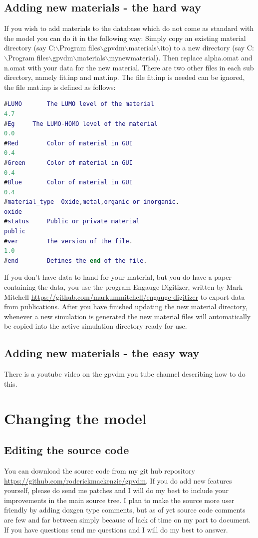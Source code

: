 \documentclass[11pt]{article}
\begin{document}
\subsection{Adding new materials - the hard way}
If you wish to add materials to the database which do not come as standard with the model you can do it in the following way:  Simply copy an existing material directory (say C:$\backslash$Program files$\backslash$gpvdm$\backslash$materials$\backslash$ito) to a new directory (say C:$\backslash$Program files$\backslash$gpvdm$\backslash$materials$\backslash$mynewmaterial).  Then replace alpha.omat and n.omat with your data for the new material. There are two other files in each sub directory, namely fit.inp and mat.inp.  The file fit.inp is needed can be ignored, the file mat.inp is defined as follows:
\newline
\newline
\begin{lstlisting}[language=matlab,frame=single]
#LUMO		The LUMO level of the material 
4.7
#Eg		The LUMO-HOMO level of the material
0.0
#Red		Color of material in GUI
0.4
#Green		Color of material in GUI
0.4
#Blue		Color of material in GUI
0.4
#material_type	Oxide,metal,organic or inorganic.
oxide
#status		Public or private material
public
#ver		The version of the file.
1.0
#end		Defines the end of the file.
\end{lstlisting}

If you don't have data to hand for your material, but you do have a paper containing the data, you use the program Engauge Digitizer, written by  Mark Mitchell \url{https://github.com/markummitchell/engauge-digitizer} to export data from publications.  After you have finished updating the new material directory, whenever a new simulation is generated the new material files will automatically be copied into the active simulation directory ready for use. 

\subsection{Adding new materials - the easy way}
There is a youtube video on the gpvdm you tube channel describing how to do this.

\section{Changing the model}
\subsection{Editing the source code}
You can download the source code from my git hub repository \url{https://github.com/roderickmackenzie/gpvdm}.  If you do add new features yourself, please do send me patches and I will do my best to include your improvements in the main source tree.  I plan to make the source more user friendly by adding doxgen type comments, but as of yet source code comments are few and far between simply because of lack of time on my part to document.  If you have questions send me questions and I will do my best to answer.
\end{document}
